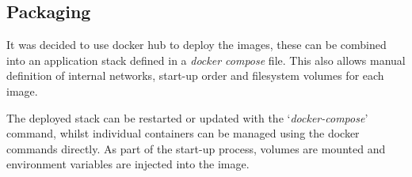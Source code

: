 \subsection{Packaging}
    \par
    It was decided to use docker hub to deploy the images, these can be combined into an application stack defined in a \textit{docker compose} file. This also allows manual definition of internal networks, start-up order and filesystem volumes for each image.

    \par
    The deployed stack can be restarted or updated with the `\textit{docker-compose}' command, whilst individual containers can be managed using the docker commands directly. As part of the start-up process, volumes are mounted and environment variables are injected into the image.